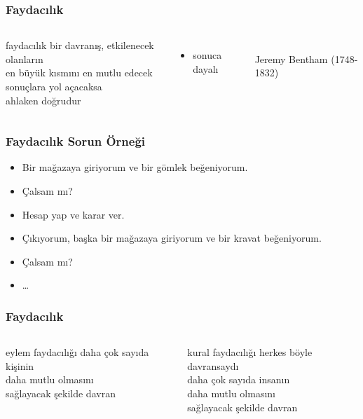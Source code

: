 \documentclass[dvipsnames]{beamer}
\theoremstyle{plain}
\begin{document}
\begin{frame}
  \frametitle{Faydacılık}

  \begin{columns}
    \begin{block}{faydacılık}
      bir davranış, etkilenecek olanların\\
      en büyük kısmını en mutlu edecek\\
      sonuçlara yol açacaksa\\
      ahlaken doğrudur
    \end{block}

    \begin{itemize}
      \item sonuca dayalı
    \end{itemize}

    \begin{center}
      \\
      Jeremy Bentham (1748-1832)
    \end{center}
  \end{columns}
\end{frame}

\begin{frame}
  \frametitle{Faydacılık Sorun Örneği}

  \begin{itemize}
    \item Bir mağazaya giriyorum ve bir gömlek beğeniyorum.
    \item Çalsam mı?
    \item Hesap yap ve karar ver.

    \pause
    \bigskip
    \item Çıkıyorum, başka bir mağazaya giriyorum ve bir kravat beğeniyorum.
    \item Çalsam mı?
    \item \ldots
  \end{itemize}
\end{frame}

\begin{frame}
  \frametitle{Faydacılık}

  \begin{columns}[t]
    \begin{block}{eylem faydacılığı}
      daha çok sayıda kişinin\\
      daha mutlu olmasını\\
      sağlayacak şekilde davran
    \end{block}

    \pause
    \begin{block}{kural faydacılığı}
      herkes böyle davransaydı\\
      daha çok sayıda insanın\\
      daha mutlu olmasını\\
      sağlayacak şekilde davran
    \end{block}
  \end{columns}
\end{frame}
\end{document}
